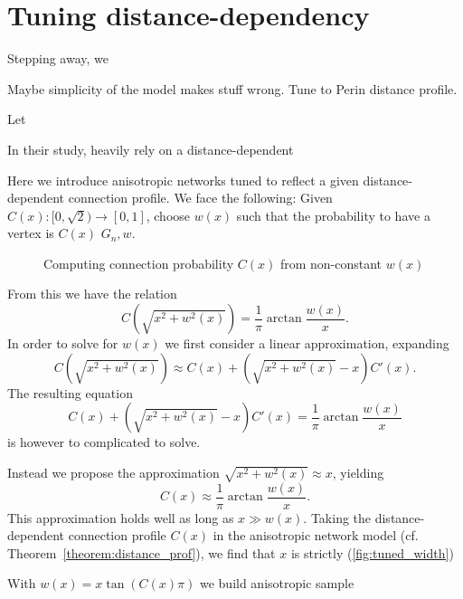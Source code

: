 \newpage
\section{Tuning distance-dependency}

Stepping away, we 




Maybe simplicity of the model makes stuff wrong. Tune to Perin
distance profile.

Let 

In their study, \textcite{Perin2011} heavily rely on a
distance-dependent 


Here we introduce anisotropic networks tuned to reflect a given
distance-dependent connection profile. We face the following: Given
$C(x):[0,\sqrt{2}) \to [0,1]$, choose $w(x)$ such that the probability
to have a vertex is $C(x)$ $G_n,w$.


\begin{figure}[htp]
  \centering
  \caption{Computing connection probability $C(x)$ from non-constant $w(x)$}
  \label{fig:dpp_wc}
\end{figure}

From this  we have the relation  
\[
C\left(\sqrt{x^2+w^2(x)}\right) = \frac{1}{\pi} \operatorname{arctan}
\frac{w(x)}{x}.
\] 
In order to solve for $w(x)$ we first consider a linear approximation,
expanding
\[C\left(\sqrt{x^2+w^2(x)}\right) \approx C(x) + \left(\sqrt{x^2+w^2(x)} -
x\right) C'(x).\]
The resulting equation
\[C(x) + \left(\sqrt{x^2+w^2(x)} -
x\right) C'(x) = \frac{1}{\pi} \operatorname{arctan}
\frac{w(x)}{x}\]
is however to complicated to solve. 

Instead we propose the approximation $\sqrt{x^2 + w^2(x)} \approx  x$,
yielding
\[
C(x) \approx \frac{1}{\pi} \operatorname{arctan} \label{eq:tanapprox}
\frac{w(x)}{x}.
\]
This approximation holds well as long as $x \gg w(x)$. Taking the
distance-dependent connection profile  $C(x)$ in the anisotropic
network model (cf. Theorem~\ref{theorem:distance_prof}), we find that
$x$ is strictly (\autoref{fig:tuned_width})




With $w(x) = x \tan\left(C(x) \pi\right) $ we build anisotropic sample 
  


